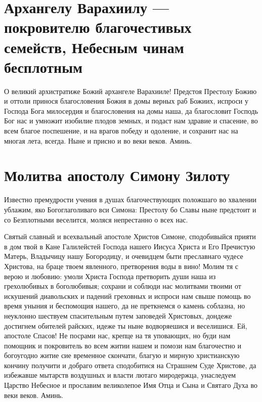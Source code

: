\vspace{-2\baselineskip}
\section{Архангелу Варахиилу --- покровителю благочестивых семейств, Небесным чинам бесплотным}\begin{mymulticols}



О великий архистратиже Божий архангеле Варахииле! Предстоя Престолу Божию и оттоли принося благословения Божия в домы верных раб Божиих, испроси у Господа Бога милосердия и благословения на домы наша, да благословит Господь Бог нас и умножит изобилие плодов земных, и подаст нам здравие и спасение, во всем благое поспешение, и на врагов победу и одоление, и сохранит нас на многая лета, всегда. Ныне и присно и во веки веков. Аминь.

\end{mymulticols}

\section{Молитва апостолу Симону Зилоту}\begin{mymulticols}




Известно премудрости учения в душах благочествующих положшаго во хвалении ублажим, яко Богоглаголиваго вси Симона: Престолу бо Славы ныне предстоит и со Безплотными веселится, моляся непрестанно о всех нас.



Святый славный и всехвальный апостоле Христов Симоне, сподобивыйся прияти в дом твой в Кане Галилейстей Господа нашего Иисуса Христа и Его Пречистую Матерь, Владычицу нашу Богородицу, и очевидцем быти преславнаго чудесе Христова, на браце твоем явленного, претворения воды в вино! Молим тя с верою и любовию: умоли Христа Господа претворить души наша из грехолюбивых в боголюбивыя; сохрани и соблюди нас молитвами твоими от искушений диавольских и падений греховных и испроси нам свыше помощь во время уныния и беспомощия нашего, да не преткнемся о камень соблазна, но неуклонно шествуем спасительным путем заповедей Христовых, дондеже достигнем обителей райских, идеже ты ныне водворяешися и веселишися. Ей, апостоле Спасов! Не посрами нас, крепце на тя уповающих, но буди нам помощник и покровитель во всем житии нашем и помози нам благочестно и богоугодно житие сие временное скончати, благую и мирную христианскую кончину получити и добраго ответа сподобитися на Страшнем Суде Христове, да избежавше мытарств воздушных и власти лютаго миродержца, унаследуем Царство Небесное и прославим великолепое Имя Отца и Сына и Святаго Духа во веки веков. Аминь.



\end{mymulticols}

